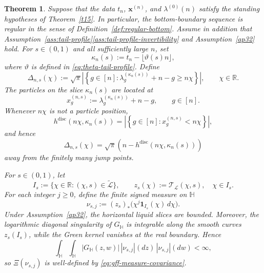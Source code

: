 \documentclass[11pt]{amsart}
\theoremstyle{plain}
\newtheorem{theorem}{Theorem}
\numberwithin{equation}{section}
\numberwithin{theorem}{section}
\numberwithin{figure}{section}
\begin{document}
\begin{theorem}
\label{thm:gff}
Suppose that the data $t_n$, $\mathbf x^{(n)}$, and
$\lambda^{(0)}(n)$ satisfy the standing hypotheses of
Theorem~\ref{t15}. In particular, the bottom-boundary sequence is
regular in the sense of Definition~\ref{def:regular-bottom}. Assume in
addition that
Assumption~\ref{ass:tail-profile}\ref{ass:tail-profile-invertibility}
and Assumption~\ref{ap32} hold. For $s\in(0,1)$ and all sufficiently large
$n$, set
\begin{equation}
    \kappa_n(s)
    :=
    t_n-\lfloor\vartheta(s)n\rfloor,
    \label{eq:kappa-general-tail}
\end{equation}
where $\vartheta$ is defined in
\eqref{eq:theta-tail-profile}. Define
\begin{equation}
    \Delta_{n,s}(\chi)
    :=
    \sqrt{\pi}
    \left|
        \left\{
            g\in[n]:
            \lambda_g^{(\kappa_n(s))}+n-g\geq n\chi
        \right\}
    \right|,
    \qquad \chi\in\mathbb R.
    \label{defDelta}
\end{equation}
The particles on the slice $\kappa_n(s)$ are located at
\[
    x_g^{(n,s)}
    :=
    \lambda_g^{(\kappa_n(s))}+n-g,
    \qquad g\in[n].
\]
Whenever $n\chi$ is not a particle position,
\[
    h^{\mathrm{disc}}(n\chi,\kappa_n(s))
    =
    \left|
        \left\{g\in[n]:x_g^{(n,s)}<n\chi\right\}
    \right|,
\]
and hence
\begin{equation}
    \Delta_{n,s}(\chi)
    =
    \sqrt\pi\left(
        n-h^{\mathrm{disc}}(n\chi,\kappa_n(s))
    \right)
    \label{eq:Delta-height}
\end{equation}
away from the finitely many jump points.

For $s\in(0,1)$, let
\[
    I_s
    :=
    \{\chi\in\mathbb R:(\chi,s)\in\widetilde{\mathcal L}\},
    \qquad
    z_s(\chi)
    :=
    \mathcal T_{\mathcal L}(\chi,s),
    \quad \chi\in I_s.
\]
For each integer $j\geq0$, define the finite signed measure on
$\mathbb H$
\begin{equation}
    \nu_{s,j}
    :=
    (z_s)_*\bigl(\chi^j\mathbf 1_{I_s}(\chi)\,d\chi\bigr).
    \label{eq:gff-curve-measure}
\end{equation}
Under Assumption~\ref{ap32}, the horizontal liquid slices are bounded.
Moreover, the logarithmic diagonal singularity of $G_{\mathbb H}$ is
integrable along the smooth curves $z_s(I_s)$, while the Green kernel
vanishes at the real boundary. Hence
\[
    \int_{\mathbb H}\int_{\mathbb H}
    |G_{\mathbb H}(z,w)|\,|\nu_{s,j}|(dz)\,|\nu_{s,j}|(dw)
    <\infty,
\]
so $\Xi(\nu_{s,j})$ is well-defined by
\eqref{eq:gff-measure-covariance}.


\end{theorem}
\end{document}
